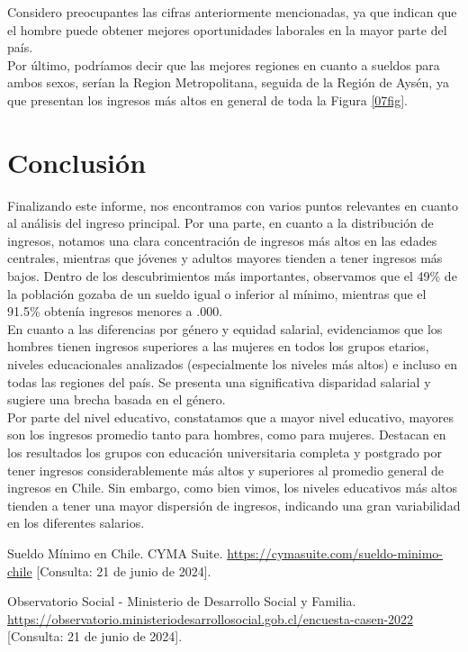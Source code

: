 \documentclass{article}
\begin{document}
	Considero preocupantes las cifras anteriormente mencionadas, ya que indican que el hombre puede obtener mejores oportunidades laborales en la mayor parte del país.\\
	
	Por último, podríamos decir que las mejores regiones en cuanto a sueldos para ambos sexos, serían la Region Metropolitana, seguida de la Región de Aysén, ya que presentan los ingresos más altos en general de toda la Figura \ref{07fig}.
	
	\FloatBarrier
	
	\section*{Conclusión}
	
	Finalizando este informe, nos encontramos con varios puntos relevantes en cuanto al análisis del ingreso principal. Por una parte, en cuanto a la distribución de ingresos, notamos una clara concentración de ingresos más altos en las edades centrales, mientras que jóvenes y adultos mayores tienden a tener ingresos más bajos. Dentro de los descubrimientos más importantes, observamos que el 49\% de la población gozaba de un sueldo igual o inferior al mínimo, mientras que el 91.5\% obtenía ingresos menores a .000.\\
	
	En cuanto a las diferencias por género y equidad salarial, evidenciamos que los hombres tienen ingresos superiores a las mujeres en todos los grupos etarios, niveles educacionales analizados (especialmente los niveles más altos) e incluso en todas las regiones del país. Se presenta una significativa disparidad salarial y sugiere una brecha basada en el género.\\
	
	Por parte del nivel educativo, constatamos que a mayor nivel educativo, mayores son los ingresos promedio tanto para hombres, como para mujeres. Destacan en los resultados los grupos con educación universitaria completa y postgrado por tener ingresos considerablemente más altos y superiores al promedio general de ingresos en Chile. Sin embargo, como bien vimos, los niveles educativos más altos tienden a tener una mayor dispersión de ingresos, indicando una gran variabilidad en los diferentes salarios.\\
	
	\newpage
	\begin{thebibliography}{99}
		
		Sueldo Mínimo en Chile.
		CYMA Suite.
		\url{https://cymasuite.com/sueldo-minimo-chile}
		[Consulta: 21 de junio de 2024].
		
		Observatorio Social - Ministerio de Desarrollo Social y Familia.
		\url{https://observatorio.ministeriodesarrollosocial.gob.cl/encuesta-casen-2022}
		[Consulta: 21 de junio de 2024].
		
	\end{thebibliography}
		
\end{document}
